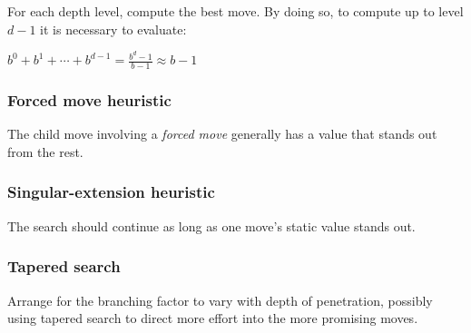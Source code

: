 \documentclass{article}
\begin{document}
For each depth level, compute the best move. By doing so, to compute up to level $d-1$ it is necessary to
evaluate:

\begin{math}
  b^0 + b^1 + \cdots + b^{d-1} = \frac{b^d-1}{b-1} \approx b-1
\end{math}

\subsubsection{Forced move heuristic}

The child move involving a \textit{forced move} generally has a
value that stands out from the rest.

\subsubsection{Singular-extension heuristic}

The search should continue as long as one move's static value
stands out.

\subsubsection{Tapered search}

Arrange for the branching factor to vary with depth of
penetration, possibly using tapered search to direct more effort
into the more promising moves.
\end{document}

